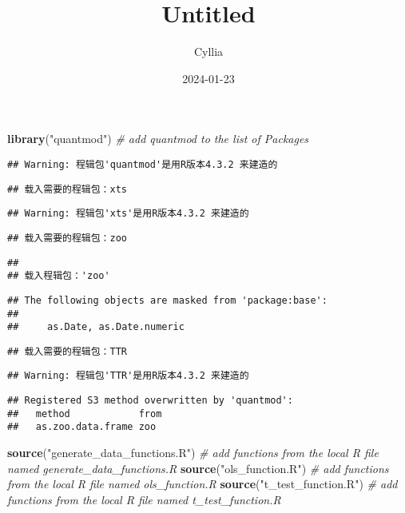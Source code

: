 \documentclass[
]{article}
\title{Untitled}
\author{Cyllia}
\date{2024-01-23}
\newenvironment{Shaded}{\begin{snugshade}}{\end{snugshade}}
\newcommand{\CommentTok}[1]{\textcolor[rgb]{0.56,0.35,0.01}{\textit{#1}}}
\newcommand{\FunctionTok}[1]{\textcolor[rgb]{0.13,0.29,0.53}{\textbf{#1}}}
\newcommand{\NormalTok}[1]{#1}
\newcommand{\StringTok}[1]{\textcolor[rgb]{0.31,0.60,0.02}{#1}}
\begin{document}
\maketitle

\begin{Shaded}
\begin{Highlighting}[]
\FunctionTok{library}\NormalTok{(}\StringTok{"quantmod"}\NormalTok{) }\CommentTok{\# add quantmod to the list of Packages}
\end{Highlighting}
\end{Shaded}

\begin{verbatim}
## Warning: 程辑包'quantmod'是用R版本4.3.2 来建造的
\end{verbatim}

\begin{verbatim}
## 载入需要的程辑包：xts
\end{verbatim}

\begin{verbatim}
## Warning: 程辑包'xts'是用R版本4.3.2 来建造的
\end{verbatim}

\begin{verbatim}
## 载入需要的程辑包：zoo
\end{verbatim}

\begin{verbatim}
## 
## 载入程辑包：'zoo'
\end{verbatim}

\begin{verbatim}
## The following objects are masked from 'package:base':
## 
##     as.Date, as.Date.numeric
\end{verbatim}

\begin{verbatim}
## 载入需要的程辑包：TTR
\end{verbatim}

\begin{verbatim}
## Warning: 程辑包'TTR'是用R版本4.3.2 来建造的
\end{verbatim}

\begin{verbatim}
## Registered S3 method overwritten by 'quantmod':
##   method            from
##   as.zoo.data.frame zoo
\end{verbatim}

\begin{Shaded}
\begin{Highlighting}[]
\FunctionTok{source}\NormalTok{(}\StringTok{"generate\_data\_functions.R"}\NormalTok{) }\CommentTok{\# add functions from the local R file named generate\_data\_functions.R}
\FunctionTok{source}\NormalTok{(}\StringTok{"ols\_function.R"}\NormalTok{) }\CommentTok{\# add functions from the local R file named ols\_function.R}
\FunctionTok{source}\NormalTok{(}\StringTok{"t\_test\_function.R"}\NormalTok{) }\CommentTok{\# add functions from the local R file named t\_test\_function.R}
\end{Highlighting}
\end{Shaded}
\end{document}
